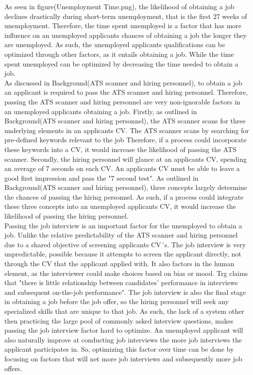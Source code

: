 As seen in figure(Unemployment Time.png), the likelihood of obtaining a job declines drastically during short-term unemployment, that is the first 27 weeks of unemployment.
Therefore, the time spent unemployed is a factor that has more influence on an unemployed applicants chances of obtaining a job the longer they are unemployed.
As such, the unemployed applicants qualifications can be optimized through other factors, as it entails obtaining a job.
While the time spent unemployed can be optimized by decreasing the time needed to obtain a job. \\

As discussed in Background(ATS scanner and hiring personnel), to obtain a job an applicant is required to pass the ATS scanner and hiring personnel.
Therefore, passing the ATS scanner and hiring personnel are very non-ignorable factors in an unemployed applicants obtaining a job.
Firstly, as outlined in Background(ATS scanner and hiring personnel), the ATS scanner scans for three underlying elements in an applicants CV.
The ATS scanner scans by searching for pre-defined keywords relevant to the job
Therefore, if a process could incorporate these keywords into a CV, it would increase the likelihood of passing the ATS scanner.
Secondly, the hiring personnel will glance at an applicants CV, spending an average of 7 seconds on each CV.
An applicants CV must be able to leave a good first impression and pass the "7 second test".
As outlined in Background(ATS scanner and hiring personnel), three concepts largely determine the chances of passing the hiring personnel.
As such, if a process could integrate these three concepts into an unemployed applicants CV, it would increase the likelihood of passing the hiring personnel. \\

Passing the job interview is an important factor for the unemployed to obtain a job.
Unlike the relative predictability of the ATS scanner and hiring personnel due to a shared objective of screening applicants CV´s.
The job interview is very unpredictable, possible because it attempts to screen the applicant directly, not through the CV that the applicant applied with.
It also factors in the human element, as the interviewer could make choices based on bias or mood.
Trg claims that "there is little relationship between candidates’ performance in interviews and subsequent on-the-job performance".\cite{Job_Interview}
The job interview is also the final stage in obtaining a job before the job offer, so the hiring personnel will seek any specialized skills that are unique to that job.
As such, the lack of a system other then practicing the large pool of commonly asked interview questions, makes passing the job interview factor hard to optimize.\cite{Job_interview_common_questions}
An unemployed applicant will also naturally improve at conducting job interviews the more job interviews the applicant participates in.
So, optimizing this factor over time can be done by focusing on factors that will net more job interviews and subsequently more job offers. \\

